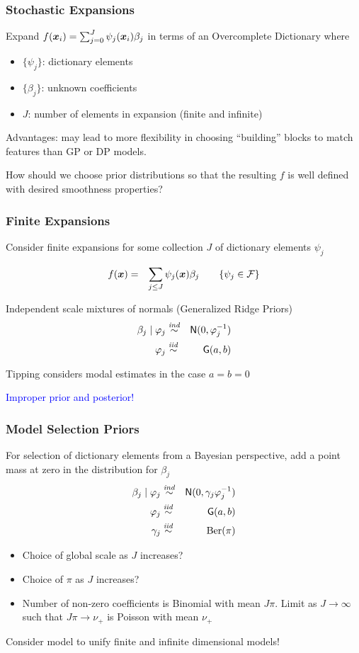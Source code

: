\documentclass[dvips]{beamer}
\newcommand{\bs}[2]{\begin{frame} \frametitle{#1} 
{#2}
\end{frame} }
\newcommand{\blue}{\textcolor{Blue}}
\begin{document}
\bs{Stochastic Expansions} {

Expand $f(\bm x_i) = \sum_{j=0}^{J}  \psi_j(\bm x_i)\beta_j$ in
terms of an Overcomplete Dictionary where
 
  \begin{itemize}
   \item  $\{\psi_j\}$: dictionary elements
   \item  $\{\beta_j\}$:  unknown coefficients
   \item  $J$: number of elements in expansion (finite and infinite)
  \end{itemize}

Advantages: may lead to more flexibility in choosing ``building''
blocks to match features than GP or DP models.

\vspace{20pt}
How should we choose prior distributions so that the resulting $f$ is
well defined with desired smoothness properties?

}



\bs{Finite Expansions} {

Consider finite expansions for some collection  $J$ of dictionary elements
$\psi_j$

\begin{eqnarray*}
f(\bm x) &  = &  \sum_{j\le J}\psi_j(\bm x) \beta_j  \quad \quad  \{ \psi_j \in \mathcal{F} \}
\end{eqnarray*}

Independent scale mixtures of normals (Generalized Ridge Priors) 
\begin{eqnarray*}
  \beta_j \mid \varphi_j & \mathrel{\mathop{\sim}\limits^{\mathit{ind}}} & \textsf{N}(0,  \varphi_j^{-1}) \\
  \varphi_j    & \mathrel{\mathop{\sim}\limits^{\mathit{iid}}} & \mbox{\sf G}(a, b) \\
\end{eqnarray*}

Tipping considers modal estimates in the case $a = b = 0$  

\blue{Improper prior and posterior!}
}
\bs{Model Selection Priors} {
For selection of dictionary elements from a Bayesian perspective, add
a point mass at zero in the distribution for $\beta_j$
\begin{eqnarray*}
  \beta_j \mid \varphi_j & \mathrel{\mathop{\sim}\limits^{\mathit{ind}}} & \textsf{N}(0, \gamma_j \varphi_j^{-1}) \\
  \varphi_j    & \mathrel{\mathop{\sim}\limits^{\mathit{iid}}} & \mbox{\sf G}(a, b) \\
  \gamma_j & \mathrel{\mathop{\sim}\limits^{\mathit{iid}}} & \mbox{\rm Ber}(\pi)
\end{eqnarray*}
\begin{itemize}
\item Choice of  global scale as $J$ increases?
\item Choice of $\pi$ as $J$ increases? 
\item Number of non-zero
  coefficients is Binomial with mean $J \pi$.
Limit as $J \to \infty$ such that $J \pi \to \nu_+$ is
  Poisson with mean $\nu_+$
\end{itemize}

Consider model to unify finite and infinite dimensional models!
}
\end{document}
